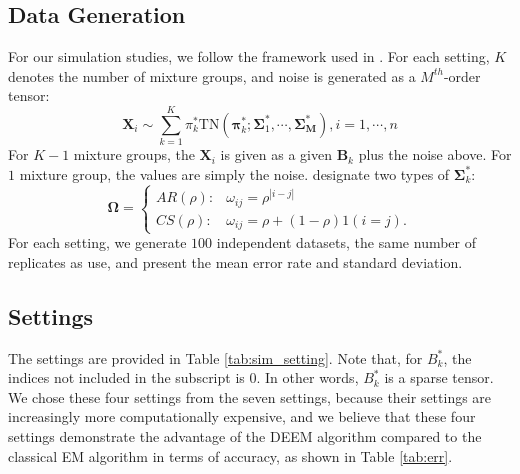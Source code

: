 \documentclass[11pt]{article}
\begin{document}
\subsection{Data Generation}

For our simulation studies, we follow the framework used in \cite{mai2022DEEM}. For each setting, $K$ denotes the number of mixture groups, and noise is generated as a $M^{th}$-order tensor:  
\begin{equation}
    \mathbf{X}_i \sim \sum_{k=1}^K \pi^*_k \mbox{TN} (\boldsymbol{\pi}^*_k; \boldsymbol{\Sigma}^*_1, \cdots, \boldsymbol{\Sigma^*_M}), i = 1, \cdots, n
\end{equation}
For $K-1$ mixture groups, the $\mathbf{X}_i$ is given as a given $\mathbf{B}_k$ plus the noise above. For $1$ mixture group, the values are simply the noise. \cite{mai2022DEEM} designate two types of $\boldsymbol{\Sigma}^*_k$: 
\[  \boldsymbol{\Omega} =   \begin{cases}
     AR(\rho): & \omega_{ij} = \rho^{|i-j|} \\
    CS(\rho): & \omega_{ij} = \rho + (1-\rho) 1(i=j).
\end{cases}\]
For each setting, we generate $100$ independent datasets, the same number of replicates as \cite{mai2022DEEM} use, and present the mean error rate and standard deviation. 

\subsection{Settings}

The settings are provided in Table \ref{tab:sim_setting}. Note that, for ${B}^*_{k}$, the indices not included in the subscript is $0$. In other words, ${B}^*_k$ is a sparse tensor. We chose these four settings from the seven settings, because their settings are increasingly more computationally expensive, and we believe that these four settings demonstrate the advantage of the DEEM algorithm compared to the classical EM algorithm in terms of accuracy, as shown in Table \ref{tab:err}. 
\end{document}
